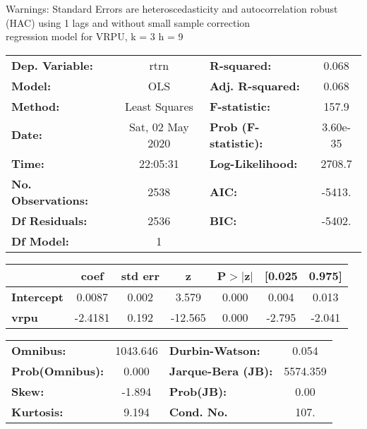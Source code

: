 Warnings: \newline
 [1] Standard Errors are heteroscedasticity and autocorrelation robust (HAC) using 1 lags and without small sample correction\\ 

regression model for VRPU, k = 3 h = 9\begin{center}
\begin{tabular}{lclc}
\toprule
\textbf{Dep. Variable:}    &       rtrn       & \textbf{  R-squared:         } &     0.068   \\
\textbf{Model:}            &       OLS        & \textbf{  Adj. R-squared:    } &     0.068   \\
\textbf{Method:}           &  Least Squares   & \textbf{  F-statistic:       } &     157.9   \\
\textbf{Date:}             & Sat, 02 May 2020 & \textbf{  Prob (F-statistic):} &  3.60e-35   \\
\textbf{Time:}             &     22:05:31     & \textbf{  Log-Likelihood:    } &    2708.7   \\
\textbf{No. Observations:} &        2538      & \textbf{  AIC:               } &    -5413.   \\
\textbf{Df Residuals:}     &        2536      & \textbf{  BIC:               } &    -5402.   \\
\textbf{Df Model:}         &           1      & \textbf{                     } &             \\
\bottomrule
\end{tabular}
\begin{tabular}{lcccccc}
                   & \textbf{coef} & \textbf{std err} & \textbf{z} & \textbf{P$> |$z$|$} & \textbf{[0.025} & \textbf{0.975]}  \\
\midrule
\textbf{Intercept} &       0.0087  &        0.002     &     3.579  &         0.000        &        0.004    &        0.013     \\
\textbf{vrpu}      &      -2.4181  &        0.192     &   -12.565  &         0.000        &       -2.795    &       -2.041     \\
\bottomrule
\end{tabular}
\begin{tabular}{lclc}
\textbf{Omnibus:}       & 1043.646 & \textbf{  Durbin-Watson:     } &    0.054  \\
\textbf{Prob(Omnibus):} &   0.000  & \textbf{  Jarque-Bera (JB):  } & 5574.359  \\
\textbf{Skew:}          &  -1.894  & \textbf{  Prob(JB):          } &     0.00  \\
\textbf{Kurtosis:}      &   9.194  & \textbf{  Cond. No.          } &     107.  \\
\bottomrule
\end{tabular}
\end{center}

